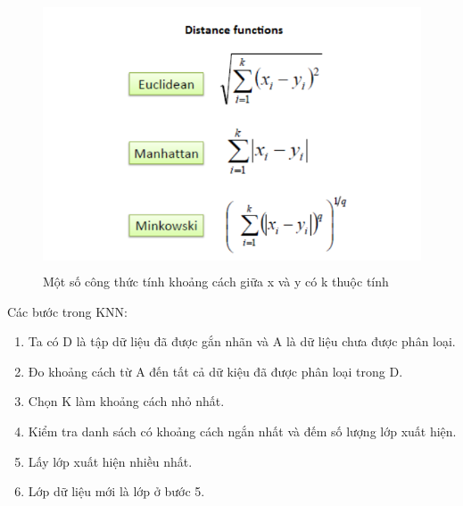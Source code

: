 \documentclass{report}
\begin{document}
    \begin{center}
        \begin{figure}[htp]
    	\begin{center}
    		\includegraphics[width=15cm, height=8cm]{images/CT_KNN.PNG}
    	\end{center}
    		\caption{Một số công thức tính khoảng cách giữa x và y có k thuộc tính}
        \end{figure}
    \end{center}
    \indent Các bước trong KNN:
    \begin{enumerate}
        \item Ta có D là tập dữ liệu đã được gắn nhãn và A là dữ liệu chưa được phân loại.
        \item Đo khoảng cách từ A đến tất cả dữ kiệu đã được phân loại trong D.
        \item Chọn K làm khoảng cách nhỏ nhất.
        \item Kiểm tra danh sách có khoảng cách ngắn nhất và đếm số lượng lớp xuất hiện.
        \item Lấy lớp xuất hiện nhiều nhất.
        \item Lớp dữ liệu mới là lớp ở bước 5.
    \end{enumerate}
\end{document}
